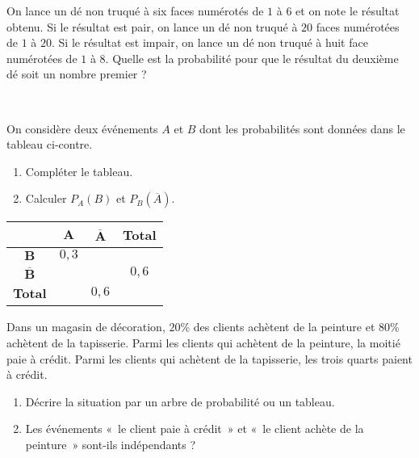 \documentclass[11pt]{article}
\begin{document}
\begin{exo}
  On lance un dé non truqué à six faces numérotés de $1$ à $6$ et on note le
  résultat obtenu. Si le résultat est pair, on lance un dé non truqué à $20$
  faces numérotées de $1$ à $20$. Si le résultat est impair, on lance un dé non
  truqué à huit face numérotées de $1$ à $8$. Quelle est la probabilité pour que
  le résultat du deuxième dé soit un nombre premier ?
\end{exo}

\vspace{2cm}
\setcounter{exo}{0}

\begin{exo}~\\
  \begin{minipage}{.65\textwidth}
    On considère deux événements $A$ et $B$ dont les probabilités sont données
    dans le tableau ci-contre.
    \begin{enumerate}
      \item Compléter le tableau.
      \item Calculer $P_A(B)$ et $P_B(\overline A)$.
    \end{enumerate}
\end{minipage}
\begin{minipage}{.35\textwidth}
  \begin{center}
 \begin{tabular}{cccc}
  \toprule
  & $\mathbf{A}$ & $\mathbf{\overline A}$ & \textbf{Total} \\
  \midrule
  $\mathbf{B}$ & $0,3$ & & \\
  $\mathbf{\overline B}$ & & & $0,6$ \\
  \textbf{Total} & & $0,6$ & \\
  \bottomrule
\end{tabular}
  \end{center}
\end{minipage}
\end{exo}


\begin{exo}
  Dans un magasin de décoration, $20$\% des clients achètent de la peinture et
  $80$\% achètent de la tapisserie. Parmi les clients qui achètent de la
  peinture, la moitié paie à crédit. Parmi les clients qui achètent de la
  tapisserie, les trois quarts paient à crédit.
  \begin{enumerate}
    \item Décrire la situation par un arbre de probabilité ou un tableau.
    \item Les événements «~le client paie à crédit~» et «~le client achète de la
      peinture~» sont-ils indépendants ?
  \end{enumerate}
\end{exo}
\end{document}
